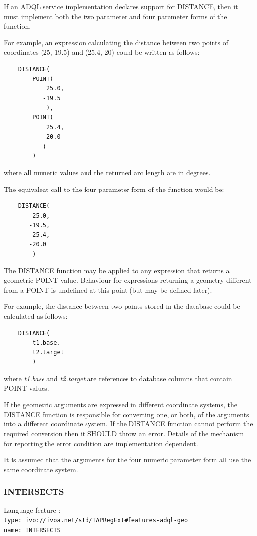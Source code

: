 \documentclass[11pt,a4paper]{ivoa}
\begin{document}
If an ADQL service implementation declares support for DISTANCE,
then it must implement both the two parameter and four parameter
forms of the function.

For example, an expression calculating the distance between two points of
coordinates (25,-19.5) and (25.4,-20) could be written as follows:
\begin{verbatim}
    DISTANCE(
        POINT(
            25.0,
           -19.5
            ),
        POINT(
            25.4,
           -20.0
           )
        )
\end{verbatim}
\noindent
where all numeric values and the returned arc length are in degrees.

The equivalent call to the four parameter form of the function would be:
\begin{verbatim}
    DISTANCE(
        25.0,
       -19.5,
        25.4,
       -20.0
        )
\end{verbatim}

The DISTANCE function may be applied to any expression that returns a
geometric POINT value. Behaviour for expressions returning a geometry different
from a POINT is undefined at this point (but may be defined later).

For example, the distance between two points stored in the database could
be calculated as follows:
\begin{verbatim}
    DISTANCE(
        t1.base,
        t2.target
        )
\end{verbatim}
\noindent
where \textit{t1.base} and \textit{t2.target} are references to
database columns that contain POINT values.

If the geometric arguments are expressed in different coordinate systems,
the DISTANCE function is responsible for converting one, or both, of the
arguments into a different coordinate system.
If the DISTANCE function cannot perform the required conversion then
it SHOULD throw an error.
Details of the mechanism for reporting the error condition are
implementation dependent.

It is assumed that the arguments for the four numeric parameter form all
use the same coordinate system.

\subsubsection{INTERSECTS}
\label{sec:functions.geom.intersects}
{\footnotesize Language feature :}\\
{\footnotesize \verb|type: ivo://ivoa.net/std/TAPRegExt#features-adql-geo|}\\
{\footnotesize \verb|name: INTERSECTS|}\\
\end{document}
